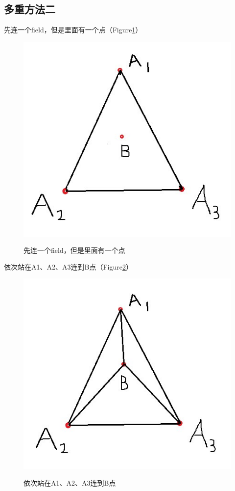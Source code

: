 \documentclass[12pt]{article}
\theoremstyle{definition}
\theoremstyle{remark}
\numberwithin{equation}{section}
\begin{document}
\subsection{多重方法二}
先连一个field，但是里面有一个点（Figure\ref{m21}）\par
\begin{figure}
  \centering
  \includegraphics[scale=0.5]{pictures/m21.png}\\
  \caption{先连一个field，但是里面有一个点}
  \label{m21}
\end{figure}
依次站在A1、A2、A3连到B点（Figure\ref{m22}）
\begin{figure}
  \centering
  \includegraphics[scale=0.5]{pictures/m22.png}\\
  \caption{依次站在A1、A2、A3连到B点}
  \label{m22}
\end{figure}
\end{document}
